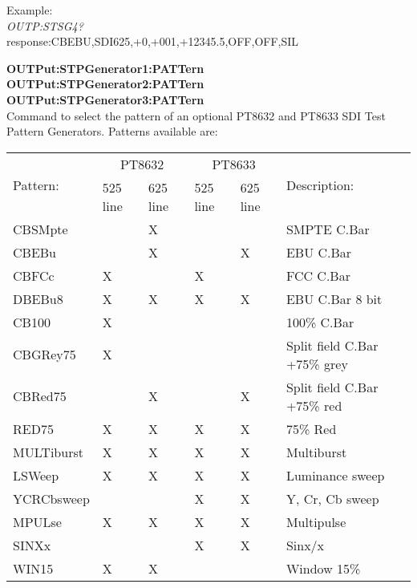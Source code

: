 Example:\\
\textit{OUTP:STSG4?}\\
response:CBEBU,SDI625,+0,+001,+12345.5,OFF,OFF,SIL

\textbf{OUTPut:STPGenerator1:PATTern}\\
\textbf{OUTPut:STPGenerator2:PATTern}\\
\textbf{OUTPut:STPGenerator3:PATTern}\\
Command to select the pattern of an optional PT8632 and PT8633 SDI Test Pattern Generators. Patterns available are:
\begin{center}

\begin{tabular}{|l|l|l|l|l|l|}
\hline
\multirow{2}{*}{Pattern:} & \multicolumn{2}{|c|}{PT8632} & \multicolumn{2}{|c|}{PT8633} & \multirow{2}{*}{Description:} \\ \cline{2-5}
 													& 525 line & 625 line					 & 525 line & 625 line & \\ \hline
CBSMpte										&						&		X					& 					&						&	SMPTE C.Bar \\ \hline
CBEBu											&						& X						&						& X					& EBU C.Bar\\ \hline
CBFCc											& X					&							& X					&						& FCC C.Bar\\ \hline
DBEBu8										& X					& X						& X					& X					& EBU C.Bar 8 bit\\ \hline
CB100											& X					&							&						&						& 100\% C.Bar\\ \hline
CBGRey75									& X					&							& 					&						& Split field C.Bar +75\% grey\\ \hline
CBRed75										&						& X						&						& X					& Split field C.Bar +75\% red\\ \hline
RED75											& X					& X						&	X					& X					& 75\% Red\\ \hline
MULTiburst								& X					& X						& X					& X					& Multiburst\\ \hline
LSWeep										& X					& X						& X					& X					& Luminance sweep\\ \hline
YCRCbsweep								&						&							& X					& X					& Y, Cr, Cb sweep\\ \hline
MPULse										& X					& X						& X					& X					& Multipulse\\ \hline
SINXx											&  					&  						&	X					&	X					& Sinx/x\\ \hline
WIN15											& X					& X						&						&						& Window 15\%\\ \hline

\end{tabular}
\end{center}
